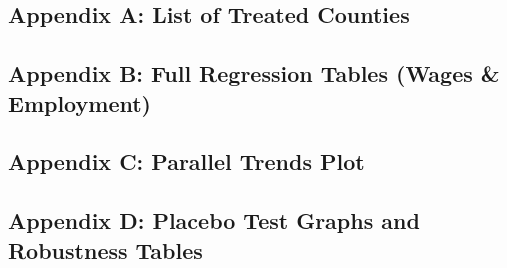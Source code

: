 \documentclass{article}
\begin{document}
\subsection*{Appendix A: List of Treated Counties}


\subsection*{Appendix B: Full Regression Tables (Wages \& Employment)}


\subsection*{Appendix C: Parallel Trends Plot}


\subsection*{Appendix D: Placebo Test Graphs and Robustness Tables}

\end{document}
